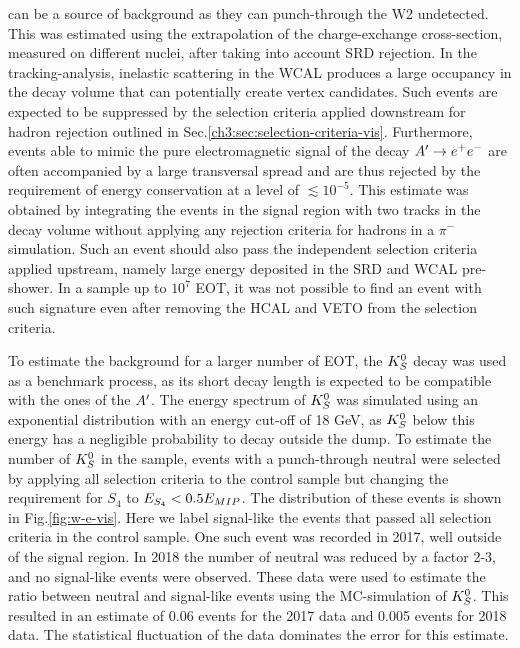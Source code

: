 can be a source of background as they can punch-through the W2 undetected. This was estimated using the extrapolation of the charge-exchange cross-section, measured on different nuclei, after taking into account SRD rejection. In the tracking-analysis, inelastic scattering in the WCAL produces a large occupancy in the decay volume that can potentially create vertex candidates. Such events are expected to be suppressed by the selection criteria applied downstream for hadron rejection outlined in Sec.\ref{ch3:sec:selection-criteria-vis}. Furthermore, events able to mimic the pure electromagnetic signal of the decay $A' \rightarrow e^+ e^-$ are often accompanied by a large transversal spread and are thus rejected by the requirement of energy conservation at a level of $\lesssim 10^{-5}$. This estimate was obtained by integrating the events in the signal region with two tracks in the decay volume without applying any rejection criteria for hadrons in a $\pi^-$ simulation. Such an event should also pass the independent selection criteria applied upstream, namely large energy deposited in the SRD and WCAL pre-shower. In a sample up to $10^7$ EOT, it was not possible to find an event with such signature even after removing the HCAL and VETO from the selection criteria.

To estimate the background for a larger number of EOT, the $K^0_S$ decay was used as a benchmark process, as its short decay length is expected to be compatible with the ones of the $A'$. The energy spectrum of $K^0_S$ was simulated using an exponential distribution with an energy cut-off of 18 GeV, as $K^0_S$ below this energy has a negligible probability to decay outside the dump. To estimate the number of $K^0_S$ in the sample, events with a punch-through neutral were selected by applying all selection criteria to the control sample but changing the requirement for $S_4$ to $E_{S_4} < 0.5 E_{MIP}$. The distribution of these events is shown in Fig.\ref{fig:w-e-vis}. Here we label signal-like the events that passed all selection criteria in the control sample. One such event was recorded in 2017, well outside of the signal region. In 2018 the number of neutral was reduced by a factor 2-3, and no signal-like events were observed. These data were used to estimate the ratio between neutral and signal-like events using the MC-simulation of $K^0_S$. This resulted in an estimate of 0.06 events for the 2017 data and 0.005 events for 2018 data. The statistical fluctuation of the data dominates the error for this estimate.

